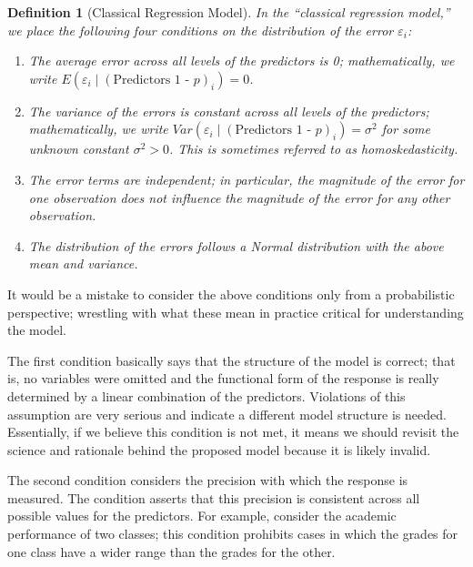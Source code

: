\documentclass[
]{book}
\providecommand{\tightlist}{%
  \setlength{\itemsep}{0pt}\setlength{\parskip}{0pt}}
\theoremstyle{plain}
\theoremstyle{mydefn}
\newtheorem{definition}{Definition}[chapter]
\theoremstyle{myexmpl}
\theoremstyle{remark}
\begin{document}
\begin{definition}[Classical Regression Model]
\protect\hypertarget{def:defn-classical-regression}{}{\label{def:defn-classical-regression} {} }In the ``classical regression model,'' we place the following four conditions on the distribution of the error \(\varepsilon_i\):

\begin{enumerate}
\def\labelenumi{\arabic{enumi}.}
\tightlist
\item
  The average error across all levels of the predictors is 0; mathematically, we write \(E\left(\varepsilon_i \mid (\text{Predictors 1 - }p)_i\right) = 0\).
\item
  The variance of the errors is constant across all levels of the predictors; mathematically, we write \(Var\left(\varepsilon_i \mid (\text{Predictors 1 - }p)_i\right) = \sigma^2\) for some unknown constant \(\sigma^2 > 0\). This is sometimes referred to as homoskedasticity.
\item
  The error terms are independent; in particular, the magnitude of the error for one observation does not influence the magnitude of the error for any other observation.
\item
  The distribution of the errors follows a Normal distribution with the above mean and variance.
\end{enumerate}
\end{definition}

It would be a mistake to consider the above conditions only from a probabilistic perspective; wrestling with what these mean in practice critical for understanding the model.

The first condition basically says that the structure of the model is correct; that is, no variables were omitted and the functional form of the response is really determined by a linear combination of the predictors. Violations of this assumption are very serious and indicate a different model structure is needed. Essentially, if we believe this condition is not met, it means we should revisit the science and rationale behind the proposed model because it is likely invalid.

The second condition considers the precision with which the response is measured. The condition asserts that this precision is consistent across all possible values for the predictors. For example, consider the academic performance of two classes; this condition prohibits cases in which the grades for one class have a wider range than the grades for the other.
\end{document}
